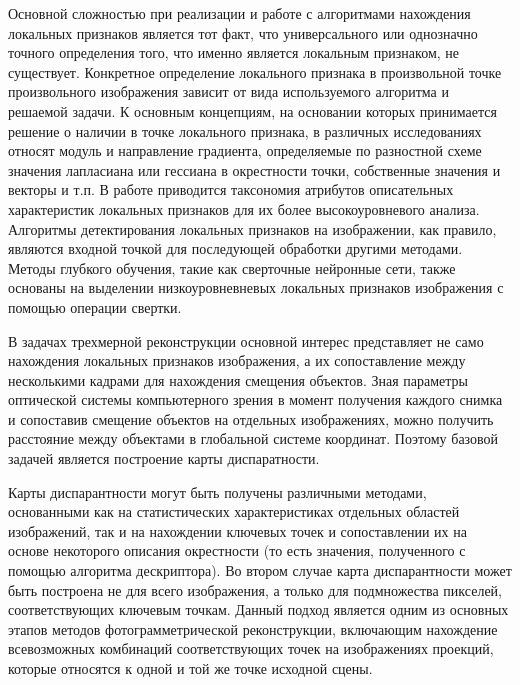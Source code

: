 Основной сложностью при реализации и работе с алгоритмами нахождения локальных признаков является тот факт, что универсального или однозначно точного определения того, что именно является локальным признаком, не существует. Конкретное определение локального признака в произвольной точке произвольного изображения зависит от вида используемого алгоритма и решаемой задачи. К основным концепциям, на основании которых принимается решение о наличии в точке локального признака, в различных исследованиях относят модуль и направление градиента, определяемые по разностной схеме значения лапласиана или гессиана в окрестности точки, собственные значения и векторы и т.п. В работе {} приводится таксономия атрибутов описательных характеристик локальных признаков для их более высокоуровневого анализа. Алгоритмы детектирования локальных признаков на изображении, как правило, являются входной точкой для последующей обработки другими методами. Методы глубкого обучения, такие как сверточные нейронные сети, также основаны на выделении низкоуровневневых локальных признаков изображения с помощью операции свертки.

В задачах трехмерной реконструкции основной интерес представляет не само нахождения локальных признаков изображения, а их сопоставление между несколькими кадрами для нахождения смещения объектов. Зная параметры оптической системы компьютерного зрения в момент получения каждого снимка и сопоставив смещение объектов на отдельных изображениях, можно получить расстояние между объектами в глобальной системе координат. Поэтому базовой задачей является построение карты диспаратности.

\begin{SCn}
\end{SCn}

\begin{SCn}
\end{SCn}

Карты диспарантности могут быть получены различными методами, основанными как на статистических характеристиках отдельных областей изображений, так и на нахождении ключевых точек и сопоставлении их на основе некоторого описания окрестности (то есть значения, полученного с помощью алгоритма дескриптора). Во втором случае карта диспарантности может быть построена не для всего изображения, а только для подмножества пикселей, соответствующих ключевым точкам. Данный подход является одним из основных этапов методов фотограмметрической реконструкции, включающим нахождение всевозможных комбинаций соответствующих точек на изображениях проекций, которые относятся к одной и той же точке исходной сцены.


